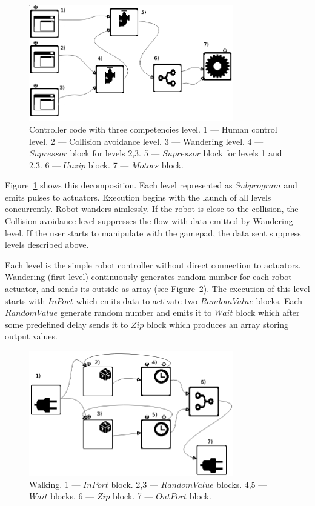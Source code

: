 \documentclass[conference,compsoc]{IEEEtran}
\begin{document}
\begin{figure}[ht]
	\centering
	\includegraphics[width=3.5in]{3layers.png}
	\caption{Controller code with three competencies level. 1 --- Human control level. 2 --- Collision avoidance level. 3 --- Wandering level. 4 --- $Supressor$ block for levels 2,3. 5 --- $Supressor$ block for levels 1 and  2,3. 6 --- $Unzip$ block.  7 --- $Motors$ block.}
	\label{image:3layers}
\end{figure}

Figure~\ref{image:3layers} shows this decomposition. Each level represented as $Subprogram$ and emits pulses to actuators. Execution begins with the launch of all levels concurrently. Robot wanders aimlessly. If the robot is close to the collision, the Collision avoidance level suppresses the flow with data emitted by Wandering level. If the user starts to manipulate with the gamepad, the data sent suppress levels described above.


Each level is the simple robot controller without direct connection to actuators. Wandering (first level) continuously generates random number for each robot actuator, and sends its outside as array (see Figure~\ref{image:1l}). The execution of this level starts with $InPort$ which emits data to activate two $RandomValue$ blocks. Each $RandomValue$ generate random number and emits it to $Wait$ block which after some predefined delay sends it to $Zip$ block which produces an array storing output values.

\begin{figure}[ht]
	\centering
	\includegraphics[width=3.5in]{1l.png}
	\caption{Walking. 1 --- $InPort$ block.  2,3 --- $RandomValue$ blocks. 4,5 --- $Wait$ blocks. 6 --- $Zip$ block. 7 --- $OutPort$ block.}
	\label{image:1l}
\end{figure}
\end{document}
